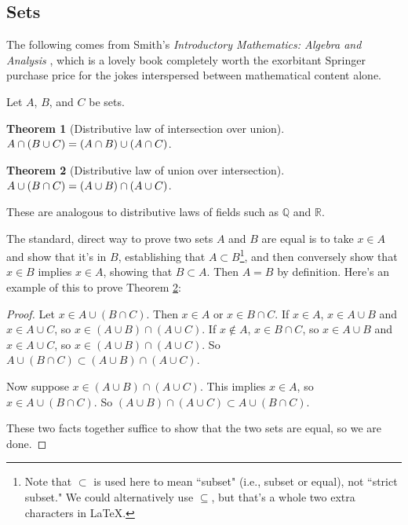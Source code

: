 \documentclass{article}
\theoremstyle{definition}
\newtheorem{theorem}{Theorem}[section]
\begin{document}
\subsection{Sets}

The following comes from Smith's \textit{Introductory Mathematics: Algebra and Analysis} \cite{smith}, which is a lovely book completely worth the exorbitant Springer purchase price for the jokes interspersed between mathematical content alone.

Let $A$, $B$, and $C$ be sets.

\begin{theorem}[Distributive law of intersection over union]
$\\ A \cap (B \cup C) = (A \cap B) \cup (A \cap C)$.
\end{theorem}

\begin{theorem}[Distributive law of union over intersection] \label{distributive-law-2}
$\\ A \cup (B \cap C) = (A \cup B) \cap (A \cup C)$.
\end{theorem}

These are analogous to distributive laws of fields such as $\mathbb{Q}$ and $\mathbb{R}$.

The standard, direct way to prove two sets $A$ and $B$ are equal is to take $x \in A$ and show that it's in $B$, establishing that $A \subset B$\footnote{Note that $\subset$ is used here to mean ``subset" (i.e., subset or equal), not ``strict subset." We could alternatively use $\subseteq$, but that's a whole two extra characters in \LaTeX.}, and then conversely show that $x \in B$ implies $x \in A$, showing that $B \subset A$. Then $A = B$ by definition. Here's an example of this to prove Theorem \ref{distributive-law-2}:

\begin{proof}
Let $x \in A \cup (B \cap C)$. Then $x \in A$ or $x \in B \cap C$. If $x \in A$, $x \in A \cup B$ and $x \in A \cup C$, so $x \in (A \cup B) \cap (A \cup C)$. If $x \notin A$, $x \in B \cap C$, so $x \in A \cup B$ and $x \in A \cup C$, so $x \in (A \cup B) \cap (A \cup C)$. So $A \cup (B \cap C) \subset (A \cup B) \cap (A \cup C)$.

Now suppose $x \in (A \cup B) \cap (A \cup C)$. This implies $x \in A$, so $x \in A \cup (B \cap C)$. So $(A \cup B) \cap (A \cup C) \subset A \cup (B \cap C)$.

These two facts together suffice to show that the two sets are equal, so we are done.
\end{proof} 
\end{document}
